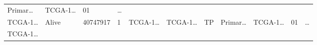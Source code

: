 \documentclass[
]{article}
\begin{document}
\begin{longtable}[]{@{}lllllllllll@{}}
\begin{minipage}[t]{0.07\columnwidth}
Primar\ldots{}\strut
\end{minipage} & \begin{minipage}[t]{0.09\columnwidth}\raggedright
TCGA-1\ldots{}\strut
\end{minipage} & \begin{minipage}[t]{0.10\columnwidth}\raggedright
01\strut
\end{minipage} & \begin{minipage}[t]{0.03\columnwidth}\raggedright
\ldots{}\strut
\end{minipage}\tabularnewline
\begin{minipage}[t]{0.07\columnwidth}\raggedright
TCGA-1\ldots{}\strut
\end{minipage} & \begin{minipage}[t]{0.04\columnwidth}\raggedright
Alive\strut
\end{minipage} & \begin{minipage}[t]{0.06\columnwidth}\raggedright
40747917\strut
\end{minipage} & \begin{minipage}[t]{0.07\columnwidth}\raggedright
1\strut
\end{minipage} & \begin{minipage}[t]{0.07\columnwidth}\raggedright
TCGA-1\ldots{}\strut
\end{minipage} & \begin{minipage}[t]{0.07\columnwidth}\raggedright
TCGA-1\ldots{}\strut
\end{minipage} & \begin{minipage}[t]{0.07\columnwidth}\raggedright
TP\strut
\end{minipage} & \begin{minipage}[t]{0.07\columnwidth}\raggedright
Primar\ldots{}\strut
\end{minipage} & \begin{minipage}[t]{0.09\columnwidth}\raggedright
TCGA-1\ldots{}\strut
\end{minipage} & \begin{minipage}[t]{0.10\columnwidth}\raggedright
01\strut
\end{minipage} & \begin{minipage}[t]{0.03\columnwidth}\raggedright
\ldots{}\strut
\end{minipage}\tabularnewline
\begin{minipage}[t]{0.07\columnwidth}\raggedright
TCGA-1\ldots{}\strut
\end{minipage} & \begin{minipage}[t]{0.04\columnwidth}\raggedright

\end{minipage}
\end{longtable}
\end{document}
